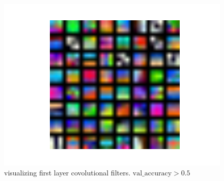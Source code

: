 \documentclass{article}
\begin{document}
\begin{figure}[H]
\centering
\includegraphics[width=1.0\linewidth]{./figure_3_2_6b}
\caption{visualizing first layer covolutional filters. $\text{val\_accuracy}>0.5$}
\label{fig:3_2_6b}
\end{figure}
\end{document}
